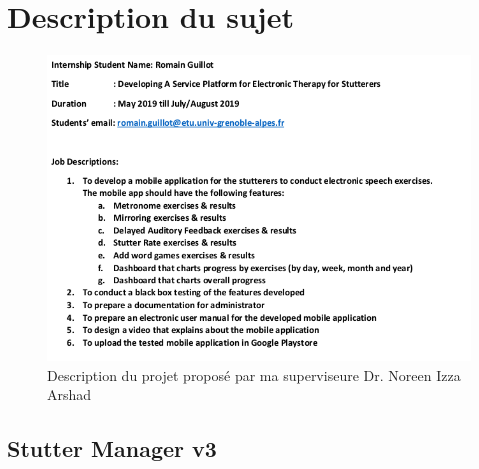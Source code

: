 \begin{appendices}

\chapter{Description du sujet}
\label{appendix:description}

\begin{figure}[h]
  \includegraphics[width=1\linewidth]{content/imgs/description.png}
  \caption*{Description du projet proposé par ma superviseure Dr. Noreen Izza Arshad}
\end{figure}


\begin{landscape}
\chapter{Stutter Manager v3}
\label{appendix:old_app}


\end{landscape}
\end{appendices}
